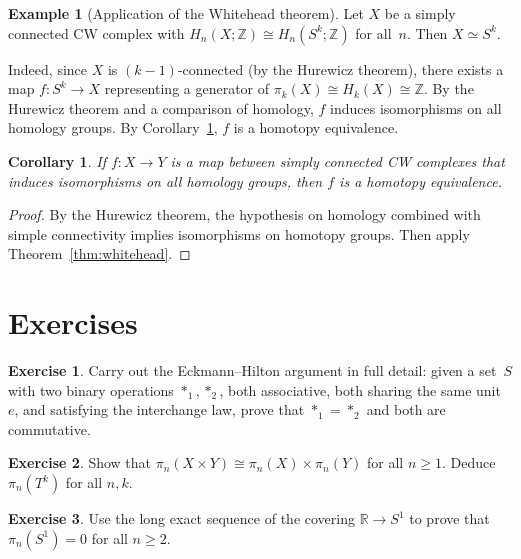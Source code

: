 \documentclass[12pt,a4paper,openany]{book}
\theoremstyle{definition}
\newtheorem{example}[definition]{Example}
\newtheorem{exercise}{Exercise}[chapter]
\theoremstyle{plain}
\newtheorem{corollary}[definition]{Corollary}
\theoremstyle{remark}
\newcommand{\Z}{\mathbb{Z}}
\newcommand{\R}{\mathbb{R}}
\begin{document}
\begin{example}[Application of the Whitehead theorem]
Let $X$ be a simply connected CW complex with
$H_n(X;\Z)\cong H_n(S^k;\Z)$ for all~$n$.  Then $X\simeq S^k$.

Indeed, since $X$ is $(k{-}1)$-connected (by the Hurewicz theorem),
there exists a map $f\colon S^k\to X$ representing a generator of
$\pi_k(X)\cong H_k(X)\cong\Z$.  By the Hurewicz theorem and a
comparison of homology, $f$ induces isomorphisms on all homology
groups.  By Corollary~\ref{cor:whitehead-homology}, $f$ is a homotopy
equivalence.
\end{example}

\begin{corollary}\label{cor:whitehead-homology}
If $f\colon X\to Y$ is a map between simply connected CW complexes
that induces isomorphisms on all homology groups, then $f$ is a
homotopy equivalence.
\end{corollary}

\begin{proof}
By the Hurewicz theorem, the hypothesis on homology combined with
simple connectivity implies isomorphisms on homotopy groups.  Then
apply Theorem~\ref{thm:whitehead}.
\end{proof}

\section{Exercises}

\begin{exercise}
Carry out the Eckmann--Hilton argument in full detail: given a set~$S$
with two binary operations $*_1,*_2$, both associative, both sharing
the same unit~$e$, and satisfying the interchange law, prove that
$*_1=*_2$ and both are commutative.
\end{exercise}

\begin{exercise}
Show that $\pi_n(X\times Y)\cong\pi_n(X)\times\pi_n(Y)$ for
all $n\ge1$.  Deduce $\pi_n(T^k)$ for all $n,k$.
\end{exercise}

\begin{exercise}
Use the long exact sequence of the covering $\R\to S^1$ to prove that
$\pi_n(S^1)=0$ for all $n\ge2$.
\end{exercise}
\end{document}
